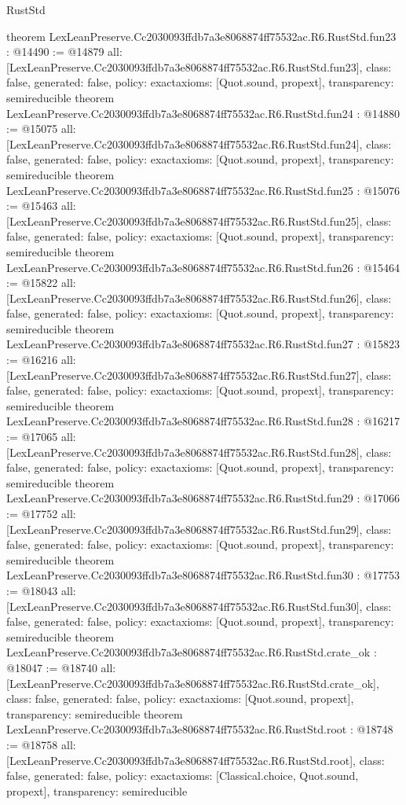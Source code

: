 \begin{lexlean}{RustStd}
\begin{coremodule}
{}
theorem LexLeanPreserve.Cc2030093ffdb7a3e8068874ff75532ac.R6.RustStd.fun23 : @14490 := @14879 {
  all: [LexLeanPreserve.Cc2030093ffdb7a3e8068874ff75532ac.R6.RustStd.fun23],
  class: false,
  generated: false,
  policy: exact{axioms: [Quot.sound, propext]},
  transparency: semireducible
}
theorem LexLeanPreserve.Cc2030093ffdb7a3e8068874ff75532ac.R6.RustStd.fun24 : @14880 := @15075 {
  all: [LexLeanPreserve.Cc2030093ffdb7a3e8068874ff75532ac.R6.RustStd.fun24],
  class: false,
  generated: false,
  policy: exact{axioms: [Quot.sound, propext]},
  transparency: semireducible
}
theorem LexLeanPreserve.Cc2030093ffdb7a3e8068874ff75532ac.R6.RustStd.fun25 : @15076 := @15463 {
  all: [LexLeanPreserve.Cc2030093ffdb7a3e8068874ff75532ac.R6.RustStd.fun25],
  class: false,
  generated: false,
  policy: exact{axioms: [Quot.sound, propext]},
  transparency: semireducible
}
theorem LexLeanPreserve.Cc2030093ffdb7a3e8068874ff75532ac.R6.RustStd.fun26 : @15464 := @15822 {
  all: [LexLeanPreserve.Cc2030093ffdb7a3e8068874ff75532ac.R6.RustStd.fun26],
  class: false,
  generated: false,
  policy: exact{axioms: [Quot.sound, propext]},
  transparency: semireducible
}
theorem LexLeanPreserve.Cc2030093ffdb7a3e8068874ff75532ac.R6.RustStd.fun27 : @15823 := @16216 {
  all: [LexLeanPreserve.Cc2030093ffdb7a3e8068874ff75532ac.R6.RustStd.fun27],
  class: false,
  generated: false,
  policy: exact{axioms: [Quot.sound, propext]},
  transparency: semireducible
}
theorem LexLeanPreserve.Cc2030093ffdb7a3e8068874ff75532ac.R6.RustStd.fun28 : @16217 := @17065 {
  all: [LexLeanPreserve.Cc2030093ffdb7a3e8068874ff75532ac.R6.RustStd.fun28],
  class: false,
  generated: false,
  policy: exact{axioms: [Quot.sound, propext]},
  transparency: semireducible
}
theorem LexLeanPreserve.Cc2030093ffdb7a3e8068874ff75532ac.R6.RustStd.fun29 : @17066 := @17752 {
  all: [LexLeanPreserve.Cc2030093ffdb7a3e8068874ff75532ac.R6.RustStd.fun29],
  class: false,
  generated: false,
  policy: exact{axioms: [Quot.sound, propext]},
  transparency: semireducible
}
theorem LexLeanPreserve.Cc2030093ffdb7a3e8068874ff75532ac.R6.RustStd.fun30 : @17753 := @18043 {
  all: [LexLeanPreserve.Cc2030093ffdb7a3e8068874ff75532ac.R6.RustStd.fun30],
  class: false,
  generated: false,
  policy: exact{axioms: [Quot.sound, propext]},
  transparency: semireducible
}
theorem LexLeanPreserve.Cc2030093ffdb7a3e8068874ff75532ac.R6.RustStd.crate_ok : @18047 := @18740 {
  all: [LexLeanPreserve.Cc2030093ffdb7a3e8068874ff75532ac.R6.RustStd.crate_ok],
  class: false,
  generated: false,
  policy: exact{axioms: [Quot.sound, propext]},
  transparency: semireducible
}
theorem LexLeanPreserve.Cc2030093ffdb7a3e8068874ff75532ac.R6.RustStd.root : @18748 := @18758 {
  all: [LexLeanPreserve.Cc2030093ffdb7a3e8068874ff75532ac.R6.RustStd.root],
  class: false,
  generated: false,
  policy: exact{axioms: [Classical.choice, Quot.sound, propext]},
  transparency: semireducible
}


\end{coremodule}
\end{lexlean}

